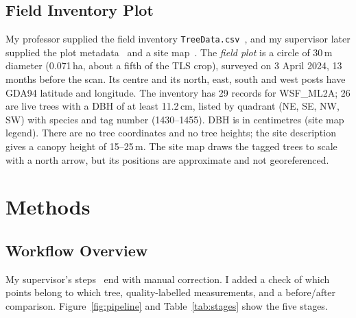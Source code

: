 \documentclass[runningheads]{llncs}
\begin{document}
\subsection{Field Inventory Plot}\label{sec:field}
My professor supplied the field inventory \texttt{TreeData.csv}~\cite{treedata}, and my supervisor later supplied the plot metadata~\cite{plotdata} and a site map~\cite{sitemap}. The \emph{field plot} is a circle of 30\,m diameter (0.071\,ha, about a fifth of the TLS crop), surveyed on 3 April 2024, 13 months before the scan. Its centre and its north, east, south and west posts have GDA94 latitude and longitude. The inventory has 29 records for WSF\_ML2A; 26 are live trees with a DBH of at least 11.2\,cm, listed by quadrant (NE, SE, NW, SW) with species and tag number (1430--1455). DBH is in centimetres (site map legend). There are no tree coordinates and no tree heights; the site description gives a canopy height of 15--25\,m. The site map draws the tagged trees to scale with a north arrow, but its positions are approximate and not georeferenced. 

\section{Methods}\label{sec:method}

\subsection{Workflow Overview}
My supervisor's steps~\cite{pipeline} end with manual correction. I added a check of which points belong to which tree, quality-labelled measurements, and a before/after comparison. Figure~\ref{fig:pipeline} and Table~\ref{tab:stages} show the five stages.
\end{document}

